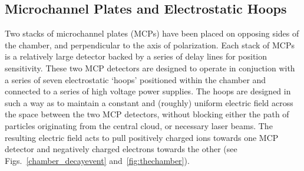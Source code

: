 \subsection{Microchannel Plates and Electrostatic Hoops}
\label{section:mcps}
Two stacks of microchannel plates (MCPs) have been placed on opposing sides of the chamber, and perpendicular to the axis of polarization.  Each stack of MCPs is a relatively large detector backed by a series of delay lines for position sensitivity.  These two MCP detectors are designed to operate in conjuction with a series of seven electrostatic `hoops' positioned within the chamber and connected to a series of high voltage power supplies.  The hoops are designed in such a way as to maintain a constant and (roughly) uniform electric field across the space between the two MCP detectors, without blocking either the path of particles originating from the central cloud, or necessary laser beams.  The resulting electric field acts to pull positively charged ions towards one MCP detector and negatively charged electrons towards the other (see Figs.~\ref{chamber_decayevent} and~\ref{fig:thechamber}).  



